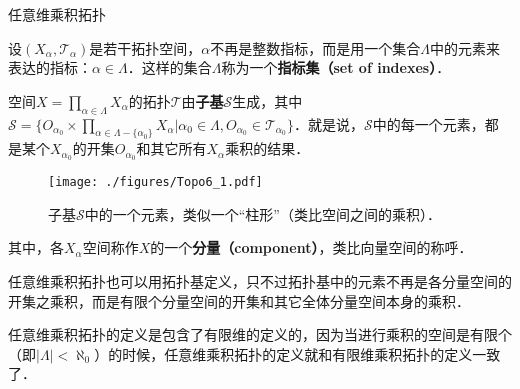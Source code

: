 \begin{definition}{任意维乘积拓扑}

设$(X_\alpha, \mathcal{T}_\alpha)$是若干拓扑空间，$\alpha$不再是整数指标，而是用一个集合$\Lambda$中的元素来表达的指标：$\alpha\in\Lambda$．这样的集合$\Lambda$称为一个\textbf{指标集（set of indexes）}．

空间$X=\prod\limits_{\alpha\in\Lambda}X_\alpha$的拓扑$\mathcal{T}$由\textbf{子基}$\mathcal{S}$生成，其中$\mathcal{S}=\{O_{\alpha_0}\times\prod\limits_{\alpha\in\Lambda-\{\alpha_0\}}X_\alpha|\alpha_0\in\Lambda, O_{\alpha_0}\in\mathcal{T}_{\alpha_0}\}$．就是说，$\mathcal{S}$中的每一个元素，都是某个$X_{\alpha_0}$的开集$O_{\alpha_0}$和其它所有$X_\alpha$乘积的结果．

\begin{figure}[ht]
\centering
\texttt{[image: ./figures/Topo6\_1.pdf]}
\caption{子基$\mathcal{S}$中的一个元素，类似一个“柱形”（类比空间之间的乘积）．} \label{Topo6_fig1}
\end{figure}

其中，各$X_\alpha$空间称作$X$的一个\textbf{分量（component）}，类比向量空间的称呼．

\end{definition}

任意维乘积拓扑也可以用拓扑基定义，只不过拓扑基中的元素不再是各分量空间的开集之乘积，而是有限个分量空间的开集和其它全体分量空间本身的乘积．

任意维乘积拓扑的定义是包含了有限维的定义的，因为当进行乘积的空间是有限个（即$|\Lambda|<\aleph_0$）的时候，任意维乘积拓扑的定义就和有限维乘积拓扑的定义一致了．


